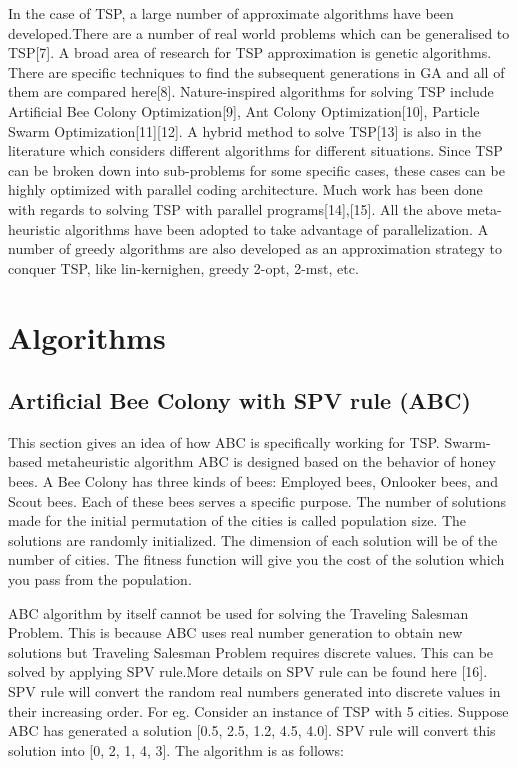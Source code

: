 \documentclass[conference]{IEEEtran}
\begin{document}
In the case of TSP, a large number of approximate algorithms have been developed.There are a number of real world problems which can  be generalised to TSP[7]. A broad area of research for TSP approximation is genetic algorithms. There are specific techniques to find the subsequent generations in GA and all of them are compared here[8]. Nature-inspired algorithms for solving TSP include Artificial Bee Colony Optimization[9], Ant Colony Optimization[10], Particle Swarm Optimization[11][12]. A hybrid method to solve TSP[13] is also in the literature which considers different algorithms for different situations. Since TSP can be broken down into sub-problems for some specific cases, these cases can be highly optimized with parallel coding architecture. Much work has been done with regards to solving TSP with parallel programs[14],[15]. All the above meta-heuristic algorithms have been adopted to take advantage of parallelization. A number of greedy algorithms are also developed as an approximation strategy to conquer TSP, like lin-kernighen, greedy 2-opt, 2-mst, etc. 


\section{Algorithms}
\subsection {Artificial Bee Colony with SPV rule (ABC)}
This section gives an idea of how ABC is specifically working for TSP. Swarm-based metaheuristic algorithm ABC is designed based on the behavior of honey bees. A Bee Colony has three kinds of bees: Employed bees, Onlooker bees, and Scout bees. Each of these bees serves a specific purpose. The number of solutions made for the initial permutation of the cities is called population size. The solutions are randomly initialized. The dimension of each solution will be of the number of cities. The fitness function will give you the cost of the solution which you pass from the population. 

ABC algorithm by itself cannot be used for solving the Traveling Salesman Problem. This is because ABC uses real number generation to obtain new solutions but Traveling Salesman Problem requires discrete values. This can be solved by applying SPV rule.More details on SPV rule can be found here [16]. SPV rule will convert the random real numbers generated into discrete values in their increasing order. For eg. Consider an instance of TSP with 5 cities. Suppose ABC has generated  a solution [0.5, 2.5, 1.2, 4.5, 4.0]. SPV rule will convert this solution into [0, 2, 1, 4, 3].  The algorithm is as follows:
\end{document}
